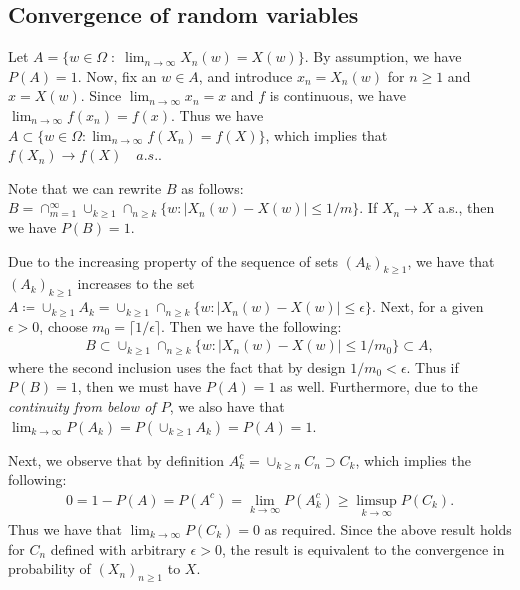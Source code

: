 \subsection{Convergence of random variables}
\label{subsec:convergence}

Let $A = \{w \in \Omega\;:\; \lim_{n \to \infty} X_n(w) = X(w)\}$. By assumption, we have $P(A)=1$. Now, fix an $w \in A$, and introduce $x_n= X_n(w)$ for $n\geq 1$ and $x=X(w)$. Since $\lim_{n \to \infty} x_n = x$ and $f$ is continuous, we have $\lim_{n \to \infty} f(x_n) = f(x)$. Thus we have $A \subset \{w \in \Omega: \lim_{n\to\infty}f(X_n) = f(X)\}$, which implies that $f(X_n) \to f(X)\quad a.s.$.


Note that we can rewrite $B$ as follows: $B = \cap_{m =1}^{\infty}\cup_{k \geq 1} \cap_{n \geq k} \{w: |X_n(w)-X(w)| \leq 1/m \}$. If $X_n \to X$ a.s., then we have $P(B)=1$. 

Due to the increasing property of the sequence of sets $(A_k)_{k \geq 1}$, we have that $(A_k)_{k \geq 1}$ increases to the set $A \coloneqq \cup_{k\geq 1}A_k = \cup_{k \geq 1}\cap_{n \geq k} \{w: |X_n(w)-X(w)|\leq \epsilon\}$. 
Next, for a given $\epsilon>0$, choose $m_0 = \lceil 1/\epsilon \rceil$. 
Then we have the following: 
\begin{align*}
    B \subset \cup_{k \geq 1}\cap_{n \geq k}\{w: |X_n(w)-X(w)|\leq 1/m_0\} \subset A,
\end{align*}
where the second inclusion uses the fact that by design $1/m_0 < \epsilon$. Thus if $P(B)=1$, then we must have $P(A)=1$ as well. Furthermore, due to the \emph{continuity from below of $P$}, we also have that $\lim_{k \to \infty} P(A_k) = P(\cup_{k \geq 1}A_k) = P(A) = 1$. 

Next, we observe that by definition $A_k^c = \cup_{k \geq n} C_n \supset C_k$, which implies the following:
\begin{align*}
    0 = 1 - P(A) = P(A^c) =  \lim_{k \to \infty}P(A_k^c) \geq \limsup_{k \to \infty}P(C_k). 
\end{align*}
Thus we have that $\lim_{k \to \infty}P(C_k) = 0$ as required. Since the above result holds for $C_n$ defined with arbitrary $\epsilon>0$, the result is equivalent to the convergence in probability of $(X_n)_{n \geq 1}$ to $X$. 
























